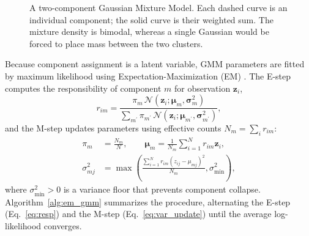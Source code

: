 \begin{figure}[t]
\centering
{}
\caption{A two-component Gaussian Mixture Model. Each dashed curve is an individual component; the solid curve is their weighted sum. The mixture density is bimodal, whereas a single Gaussian would be forced to place mass between the two clusters.}
\label{fig:gmm_illustration}
\end{figure}

Because component assignment is a latent variable, GMM parameters are fitted by maximum likelihood using Expectation-Maximization (EM) \citep{dempster1977maximum}. The E-step computes the responsibility of component $m$ for observation $\mathbf{z}_i$,
\begin{equation}
    r_{im} = \frac{\pi_m \, \mathcal{N}(\mathbf{z}_i;\bm{\mu}_m,\bm{\sigma}_m^2)}{\sum_{m^\prime} \pi_{m^\prime}\,\mathcal{N}(\mathbf{z}_i;\bm{\mu}_{m^\prime},\bm{\sigma}_{m^\prime}^2)},
    \label{eq:resp}
\end{equation}
and the M-step updates parameters using effective counts $N_m=\sum_i r_{im}$:
\begin{align}
    \pi_m &= \frac{N_m}{N}, \qquad
    \bm{\mu}_m = \frac{1}{N_m}\sum_{i=1}^N r_{im}\mathbf{z}_i, \\
    \sigma_{mj}^2 &= \max\!\left(\frac{\sum_{i=1}^N r_{im}(z_{ij}-\mu_{mj})^2}{N_m},\sigma^2_{\min}\right),
    \label{eq:var_update}
\end{align}
where $\sigma^2_{\min}>0$ is a variance floor that prevents component collapse. Algorithm~\ref{alg:em_gmm} summarizes the procedure, alternating the E-step (Eq.~\eqref{eq:resp}) and the M-step (Eq.~\eqref{eq:var_update}) until the average log-likelihood converges.

